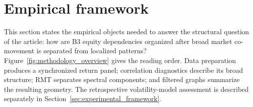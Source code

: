 \section{Empirical framework}
\label{sec:methodology}

This section states the empirical objects needed to answer the structural question of the article: how are B3 equity dependencies organized after broad market co-movement is separated from localized patterns? Figure~\ref{fig:methodology_overview} gives the reading order. Data preparation produces a synchronized return panel; correlation diagnostics describe its broad structure; RMT separates spectral components; and filtered graphs summarize the resulting geometry. The retrospective volatility-model assessment is described separately in Section~\ref{sec:experimental_framework}.

